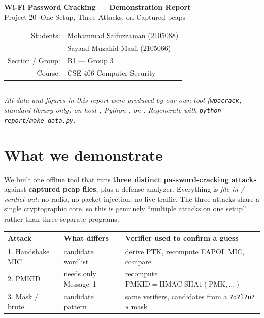 \documentclass[11pt,a4paper]{article}
\begin{document}
\begin{center}
{\LARGE\bfseries Wi-Fi Password Cracking --- Demonstration Report}\\[0.35em]
{\large Project 20 \quad$\cdot$\quad One Setup, Three Attacks, on Captured pcaps}\\[0.6em]
\begin{tabular}{rl}
Students: & Mohammad Saifuzzaman (2105088) \\
          & Sayaad Muzahid Masfi (2105066) \\
Section / Group: & B1 --- Group 3 \\
Course: & CSE 406 Computer Security \\
\end{tabular}
\end{center}

\vspace{0.3em}
\noindent\rule{\textwidth}{0.4pt}
\vspace{0.2em}

\noindent\small\textit{All data and figures in this report were produced by our own tool
(\texttt{wpacrack}, standard library only) on host \texttt{\genhost}, Python \genpython,
on \gendate. Regenerate with \texttt{python report/make\_data.py}.}\normalsize

\section{What we demonstrate}

We built one offline tool that runs \textbf{three distinct password-cracking attacks}
against \textbf{captured pcap files}, plus a defense analyzer. Everything is
\emph{file-in / verdict-out}: no radio, no packet injection, no live traffic. The three
attacks share a single cryptographic core, so this is genuinely ``multiple attacks on one
setup'' rather than three separate programs.

\begin{center}
\begin{tabularx}{\textwidth}{@{}l l X@{}}
\toprule
\textbf{Attack} & \textbf{What differs} & \textbf{Verifier used to confirm a guess} \\
\midrule
1. Handshake MIC & candidate = wordlist & derive PTK, recompute EAPOL MIC, compare \\
2. PMKID         & needs only Message~1 & recompute $\text{PMKID}=\text{HMAC-SHA1}(\text{PMK},\ldots)$ \\
3. Mask / brute  & candidate = pattern  & same verifiers, candidates from a \texttt{?d?l?u?s} mask \\
\bottomrule
\end{tabularx}
\end{center}
\end{document}
